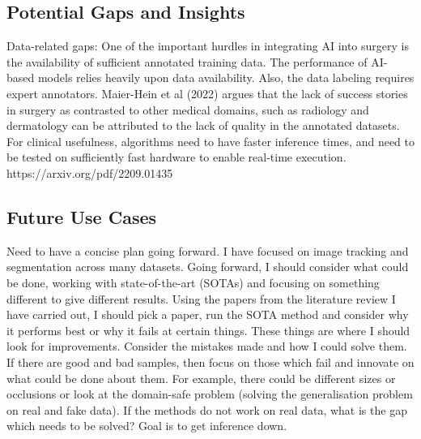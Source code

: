 \subsection{Potential Gaps and Insights}


Data-related gaps: One of the important hurdles in integrating AI into surgery is the availability of sufficient annotated training data. The performance of AI-based models relies heavily upon data availability. Also, the data labeling requires expert annotators. Maier-Hein et al (2022) argues that the lack of success stories in surgery as contrasted to other medical domains, such as radiology and dermatology can be attributed to the lack of quality in the annotated datasets. For clinical usefulness, algorithms need to have faster inference times, and need to be tested on sufficiently fast hardware to enable real-time execution. https://arxiv.org/pdf/2209.01435

\subsection{Future Use Cases}

Need to have a concise plan going forward. I have focused on image tracking and segmentation across many datasets. Going forward, I should consider what could be done, working with state-of-the-art (SOTAs) and focusing on something different to give different results. Using the papers from the literature review I have carried out, I should pick a paper, run the SOTA method and consider why it performs best or why it fails at certain things. These things are where I should look for improvements. Consider the mistakes made and how I could solve them. If there are good and bad samples, then focus on those which fail and innovate on what could be done about them. For example, there could be different sizes or occlusions or look at the domain-safe problem (solving the generalisation problem on real and fake data). If the methods do not work on real data, what is the gap which needs to be solved? Goal is to get inference down.